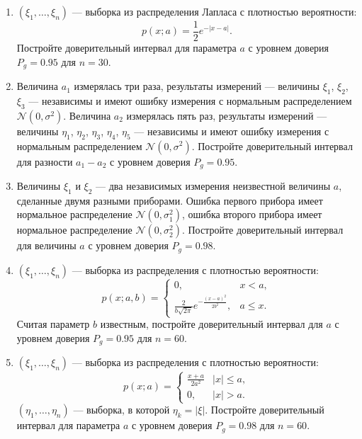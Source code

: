 \documentclass[a4paper,12pt]{article}
\newcommand{\modulus}[1]{\left | #1 \right |}
\newcommand{\sample}[2]{\left( #1_1, \dots, #1_{#2} \right)}
\begin{document}
\begin{enumerate}[topsep=1cm, parsep=1cm, resume]
        \item $\sample{\xi}{n}$ --- выборка из распределения Лапласа с плотностью вероятности:
              \[
                  p(x; a)
                  = \frac{1}{2} e^{- \modulus{x-a}}.
              \]
              Постройте доверительный интервал для параметра $a$ с уровнем доверия $P_g = 0.95$ для $n = 30$.

        \item Величина $a_1$ измерялась три раза, результаты измерений --- величины  $\xi_1$, $\xi_2$, $\xi_3$ --- независимы и имеют ошибку измерения
              с нормальным распределением $\mathcal{N}(0,\sigma^2)$. Величина $a_2$ измерялась пять раз, результаты измерений --- величины  $\eta_1$, $\eta_2$,
              $\eta_3$, $\eta_4$, $\eta_5$ --- независимы и имеют ошибку измерения с нормальным распределением $\mathcal{N}(0,\sigma^2)$.
              Постройте доверительный интервал для разности $a_1 - a_2$ с уровнем доверия $P_g = 0.95$.

        \item Величины $\xi_1$ и $\xi_2$ --- два независимых измерения неизвестной величины $a$, сделанные двумя разными приборами. Ошибка первого прибора
              имеет нормальное распределение $\mathcal{N}(0,\sigma_1^2)$, ошибка второго прибора имеет нормальное распределение $\mathcal{N}(0,\sigma_2^2)$.
              Постройте доверительный интервал для величины $a$ с уровнем доверия $P_g = 0.98$.

        \item $\sample{\xi}{n}$ --- выборка из распределения с плотностью вероятности:
              \[
                  p(x; a, b)
                  = \left \{
                  \begin{array}{ll}
                      0,                                                    & x < a,    \\
                      \frac{2}{b \sqrt{2 \pi}} e^{- \frac{(x-a)^2}{2 b^2}}, & a \le x .
                  \end{array}
                  \right .
              \]
              Считая параметр $b$ известным, постройте доверительный интервал для $a$ с уровнем доверия $P_g = 0.95$ для $n=60$.

        \item $\sample{\xi}{n}$ --- выборка из распределения с плотностью вероятности:
              \[
                  p(x; a)
                  = \left \{
                  \begin{array}{ll}
                      \frac{x+a}{2 a^2} & \modulus{x} \le a , \\
                      0,                & \modulus{x} > a .
                  \end{array}
                  \right .
              \]
              $\sample{\eta}{n}$ --- выборка, в которой $\eta_k = \modulus{\xi}$. Постройте доверительный интервал для параметра $a$ с уровнем доверия
              $P_g = 0.98$ для $n = 60$.


\end{enumerate}
\end{document}
